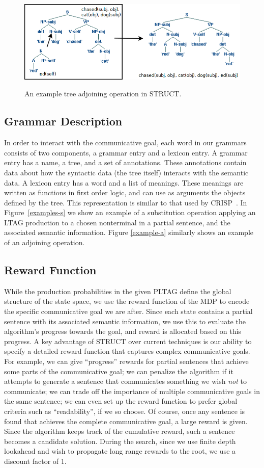 \begin{figure}[t]
\centering
\includegraphics[width= 0.7 \linewidth]{adjoin-example.png}\label{examples-a}
\caption{An example tree adjoining operation in STRUCT.}
\end{figure}

\subsection{Grammar Description}
 In order to interact with the communicative goal, each word in our
 grammars consists of two components, a grammar entry and a lexicon
 entry.  A grammar entry has a name, a tree, and a set of annotations.
 These annotations contain data about how the syntactic data (the tree
 itself) interacts with the semantic data.  A lexicon entry has a word
 and a list of meanings.  These meanings are written as functions in
 first order logic, and can use as arguments the objects defined by
 the tree. This representation is similar to that used by
 CRISP~\cite{koller_sentence_2007}. In Figure~\ref{examples-s}
  we show an example of a substitution operation applying an LTAG production to
 a chosen nonterminal in a partial sentence, and the associated
 semantic information.  Figure \ref{example-a} similarly shows an example
 of an adjoining operation.

\subsection{Reward Function}
 While the production probabilities in the given PLTAG define the
 global structure of the state space, we use the reward function of
 the MDP to encode the specific communicative goal we are after. Since
 each state contains a partial sentence with its associated semantic
 information, we use this to evaluate the algorithm's progress towards
 the goal, and reward is allocated based on this progress. A key
 advantage of STRUCT over current techniques is our ability to specify
 a detailed reward function that captures complex communicative goals.
 For example, we can give ``progress'' rewards for partial sentences
 that achieve some parts of the communicative goal; we can penalize
 the algorithm if it attempts to generate a sentence that communicates
 something we wish {\em not} to communicate; we can trade off the
 importance of multiple communicative goals in the same sentence; we
 can even set up the reward function to prefer global criteria such as
 ``readability'', if we so choose. Of course, once any sentence is
 found that achieves the complete communicative goal, a large reward
 is given. Since the algorithm keeps track of the cumulative reward,
 such a sentence becomes a candidate solution. During the search,
 since we use finite depth lookahead and wish to propagate long range
 rewards to the root, we use a discount factor of 1.

